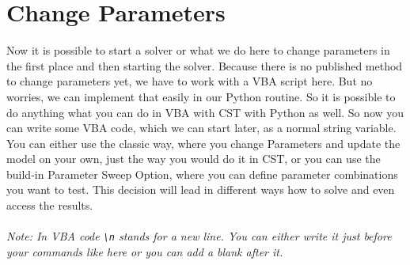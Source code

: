 \documentclass[12pt,accentcolor=tud2b, colorback, openany]{tudreport}
\begin{document}
	\section{Change Parameters}
	Now it is possible to start a solver or what we do here to change parameters in the first place and then starting the solver. Because there is no published method to change parameters yet, we have to work with a VBA script here. But no worries, we can implement that easily in our Python routine. So it is possible to do anything what you can do in VBA with CST with Python as well. So now you can write some VBA code, which we can start later, as a normal string variable. You can either use the classic way, where you change Parameters and update the model on your own, just the way you would do it in CST, or you can use the build-in Parameter Sweep Option, where you can define parameter combinations you want to test. This decision will lead in different ways how to solve and even access the results.\\
	\\
	\textit{Note: In VBA code \texttt{\textbackslash n} stands for a new line. You can either write it just before your commands like here or you can add a blank after it.}
\end{document}
